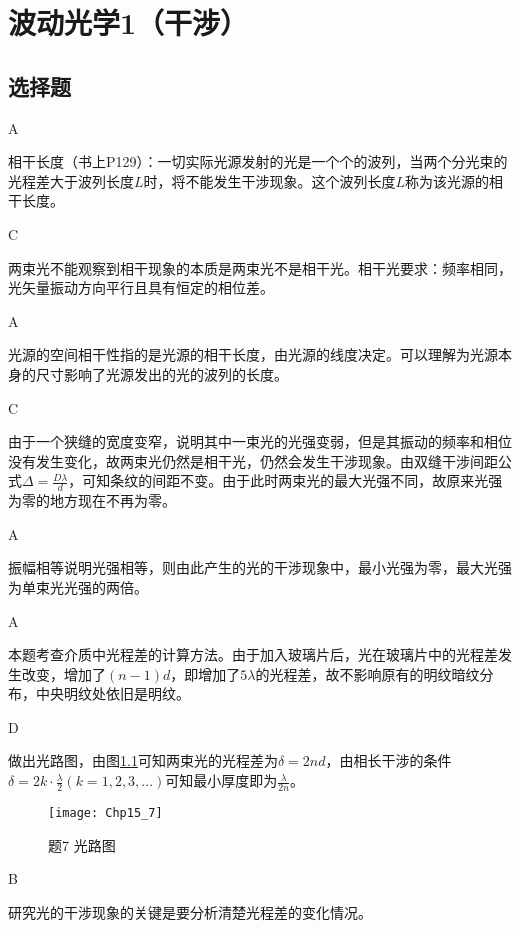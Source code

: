 \chapter{波动光学1（干涉）}
\makeatletter
{}
\makeatother
\section{选择题}
\exercise A

\solve 相干长度（书上P129）：一切实际光源发射的光是一个个的波列，当两个分光束的光程差大于波列长度$L$时，将不能发生干涉现象。这个波列长度$L$称为该光源的相干长度。 

\exercise C

\solve 两束光不能观察到相干现象的本质是两束光不是相干光。相干光要求：频率相同，光矢量振动方向平行且具有恒定的相位差。

\exercise A

\solve 光源的空间相干性指的是光源的相干长度，由光源的线度决定。可以理解为光源本身的尺寸影响了光源发出的光的波列的长度。

\exercise C

\solve 由于一个狭缝的宽度变窄，说明其中一束光的光强变弱，但是其振动的频率和相位没有发生变化，故两束光仍然是相干光，仍然会发生干涉现象。由双缝干涉间距公式$\Delta=\frac{D\lambda}{d}$，可知条纹的间距不变。由于此时两束光的最大光强不同，故原来光强为零的地方现在不再为零。

\exercise A

\solve 振幅相等说明光强相等，则由此产生的光的干涉现象中，最小光强为零，最大光强为单束光光强的两倍。

\exercise A

\solve 本题考查介质中光程差的计算方法。由于加入玻璃片后，光在玻璃片中的光程差发生改变，增加了$(n-1)d$，即增加了$5\lambda$的光程差，故不影响原有的明纹暗纹分布，中央明纹处依旧是明纹。

\exercise D

\solve 做出光路图，由图\ref{fig:15_7}可知两束光的光程差为$\delta=2nd$，由相长干涉的条件$\delta=2k\cdot\frac{\lambda}{2}(k=1,2,3,...)$可知最小厚度即为$\frac{\lambda}{2n}$。
\begin{figure}[!h]
	\centering
	\texttt{[image: Chp15\_7]}
	\caption{题7 光路图}\label{fig:15_7}
\end{figure}

\exercise B

\solve 研究光的干涉现象的关键是要分析清楚光程差的变化情况。


